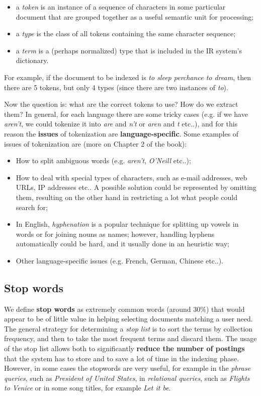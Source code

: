 \begin{itemize}
    \item a \textit{token} is an instance of a sequence of characters in some particular document that are grouped together as a useful semantic unit for processing;
    \item a \textit{type} is the class of all tokens containing the same character sequence;
    \item a \textit{term} is a (perhaps normalized) type that is included in the IR system’s dictionary.
\end{itemize}

For example, if the document to be indexed is \textit{to sleep perchance to dream}, then there are 5 tokens, but only 4 types (since there are two instances of \textit{to}). 

Now the question is: what are the correct tokens to use? How do we extract them? In general, for each language there are some tricky cases (e.g. if we have \textit{aren't}, we could tokenize it into \textit{are} and \textit{n't} or \textit{aren} and \textit{t} etc..), and for this reason the \textbf{issues} of tokenization are \textbf{language-specific}. Some examples of issues of tokenization are (more on Chapter 2 of the book):

\begin{itemize}
    \item How to split ambiguous words (e.g. \textit{aren't}, \textit{O'Neill} etc..);
    \item How to deal with special types of characters, such as e-mail addresses, web URLs, IP addresses etc.. A possible solution could be represented by omitting them, resulting on the other hand in restricting a lot what people could search for;
    \item In English, \textit{hyphenation} is a popular technique for splitting up vowels in words or for joining nouns as names; however, handling hyphens automatically could be hard, and it usually done in an heuristic way;
    \item Other language-specific issues (e.g. French, German, Chinese etc..).
\end{itemize}

\subsection{Stop words}
We define \textbf{stop words} as extremely common words (around 30\%) that would appear to be of little value in helping selecting documents matching a user need. The general strategy for determining a \textit{stop list} is to sort the terms by collection frequency, and then to take the most frequent terms and discard them. The usage of the stop list allows both to significantly \textbf{reduce the number of postings} that the system has to store and to save a lot of time in the indexing phase. However, in some cases the stopwords are very useful, for example in the \textit{phrase queries}, such as \textit{President of United States}, in \textit{relational queries}, such as \textit{Flights to Venice} or in some song titles, for example \textit{Let it be}.

